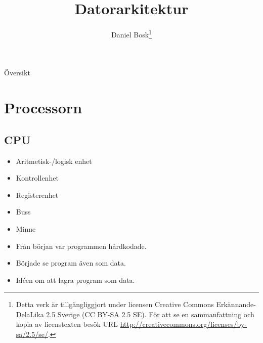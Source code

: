 \documentclass{beamer}
\title{%
  Datorarkitektur
}
\author{Daniel Bosk\footnote{%
  \tiny
  Detta verk är tillgängliggjort under licensen Creative Commons 
  Erkännande-DelaLika 2.5 Sverige (CC BY-SA 2.5 SE).
  För att se en sammanfattning och kopia av licenstexten besök URL 
  \url{http://creativecommons.org/licenses/by-sa/2.5/se/}.
}}
\institute[MIUN IKS]{%
  Avdelningen för informations- och kommunikationssytem (IKS),\\
  Mittuniversitetet, Sundsvall.
}
\date{\svnId}
\theoremstyle{definition}
\theoremstyle{remark}
\begin{document}
\begin{frame}
  \titlepage
\end{frame}

\begin{frame}{Översikt}
  \tableofcontents
\end{frame}

%  





\section{Processorn}

\subsection{CPU}

\begin{frame}{\insertsubsectionhead}
  \begin{itemize}
    \item Aritmetisk-/logisk enhet
    \item Kontrollenhet
    \item Registerenhet
  \end{itemize}
  \begin{itemize}
    \item Buss
    \item Minne
  \end{itemize}
\end{frame}

\begin{frame}{\insertsubsectionhead}
  \begin{itemize}
    \item Från början var programmen hårdkodade.
    \item Började se program även som data.
    \item Idéen om att lagra program som data.
  \end{itemize}
\end{frame}
\end{document}
